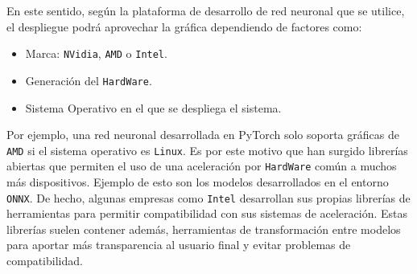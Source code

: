 \begin{itemize}
    En este sentido, según la plataforma de desarrollo de red neuronal que se utilice, el despliegue podrá aprovechar la gráfica dependiendo de factores como:
    
    \begin{itemize}
        \item Marca: \texttt{NVidia}, \texttt{AMD} o \texttt{Intel}.
        \item Generación del \texttt{HardWare}.
        \item Sistema Operativo en el que se despliega el sistema.
    \end{itemize}

    Por ejemplo, una red neuronal desarrollada en PyTorch solo soporta gráficas de \texttt{AMD} si el sistema operativo es \texttt{Linux}. Es por este motivo 
    que han surgido librerías abiertas que permiten el uso de una aceleración por \texttt{HardWare} común a muchos más dispositivos. Ejemplo de esto son los modelos 
    desarrollados en el entorno \texttt{ONNX}.
    De hecho, algunas empresas como \texttt{Intel} desarrollan sus propias librerías de herramientas para permitir compatibilidad con sus sistemas de aceleración. Estas librerías 
    suelen contener además, herramientas de transformación entre modelos para aportar más transparencia al usuario final y evitar problemas de compatibilidad.
\end{itemize}
